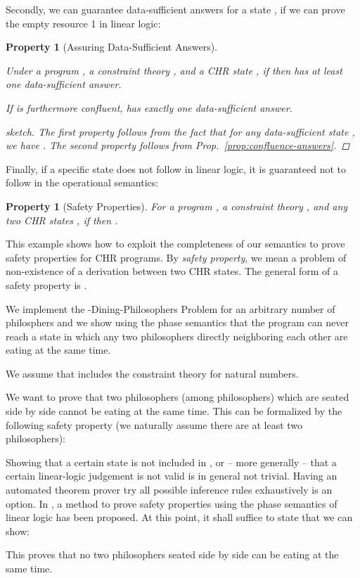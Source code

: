 \documentclass[acmtocl]{acmtrans2m}
\newtheorem{property}[theorem]{Property}
\begin{document}
Secondly, we can guarantee data-sufficient answers for a state , if we can
prove the empty resource 1 in linear logic:

\begin{property}[Assuring Data-Sufficient Answers]
\label{lemma:app-assure-ds}
\begin{longenum}
\item Under a program , a constraint theory , and a CHR state , if
 then  has at least one
data-sufficient answer.
\item If  is furthermore confluent,  has exactly one
data-sufficient answer.
\end{longenum}
\begin{proof}[sketch]
The first property follows from the fact that for any data-sufficient state
, we have
. The second property
follows from Prop.~\ref{prop:confluence-answers}.
\end{proof}
\end{property}

Finally, if a specific state does not follow in linear logic, it is guaranteed
not to follow in the operational semantics:

\begin{property}[Safety Properties]
\label{lemma:app-safety-properties}
For a program , a constraint theory , and any two CHR states , if
 then .
\end{property}

\begin{example}
	\label{example::philosophers}
This example shows how to exploit the completeness of our semantics
to prove safety properties for CHR programs. By \emph{safety property}, we mean
a problem of non-existence of a derivation between two CHR states. The general
form of a safety property is .

We implement the -Dining-Philosophers Problem for an arbitrary
number of philosphers and we show using the phase semantics that the program can
never reach a state in which any two philosophers directly neighboring each
other are eating at the same time.

We assume that 
includes the constraint theory for natural numbers.

We want to prove that two philosophers (among  philosophers) which
are seated side by side cannot be eating at the same time. This can be
formalized by the following safety property (we naturally assume
there are at least two philosophers):

Showing that a certain state is not included in , or -- more
generally -- that a certain linear-logic judgement is not valid is in general
not trivial. Having an automated theorem prover try all possible inference
rules exhaustively is an option. In \cite{Betz2008}, a method to
prove safety properties using the phase semantics of linear logic has been
proposed. At this point, it shall suffice to state that we can show:

This proves that no two philosophers seated side by side can be eating at the
same time.
\end{example}
\end{document}
